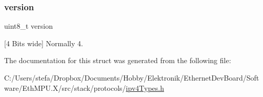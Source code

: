 \mbox{\label{structipv4_header__t_ab22abc2906422da61885ac6c8e6a1a59}} 
\subsubsection{\texorpdfstring{version}{version}}
{\footnotesize\ttfamily uint8\+\_\+t version}



\mbox{[}4 Bits wide\mbox{]} Normally 4. 



The documentation for this struct was generated from the following file\+:\begin{DoxyCompactItemize}
\item 
C\+:/\+Users/stefa/\+Dropbox/\+Documents/\+Hobby/\+Elektronik/\+Ethernet\+Dev\+Board/\+Software/\+Eth\+M\+P\+U.\+X/src/stack/protocols/\mbox{\hyperlink{ipv4_types_8h}{ipv4\+Types.\+h}}\end{DoxyCompactItemize}

